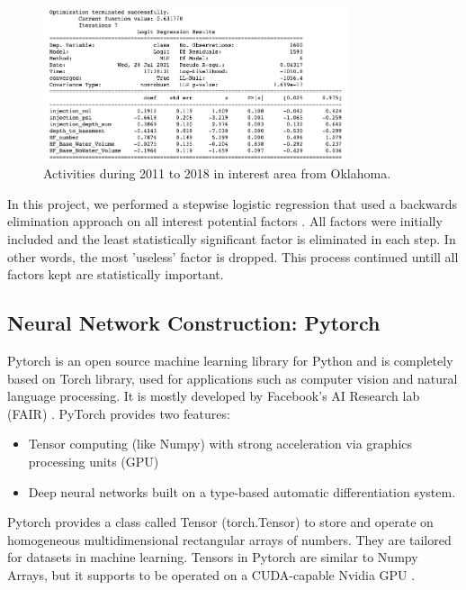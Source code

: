\documentclass[final-report]{report-template}
\begin{document}
\begin{figure}
    \begin{center}
        \includegraphics[width=0.8\textwidth]{p-value.png}
    \end{center}
    \caption{\label{fig:p-value} Activities during 2011 to 2018 in interest area from Oklahoma.}
\end{figure}

In this project, we performed a stepwise logistic regression that used a backwards elimination approach on all interest potential factors \citep{Ryan}.
All factors were initially included and the least statistically significant factor is eliminated in each step. In other words, the most 'useless' factor is dropped. This process continued untill all factors kept are statistically important.

\subsection{Neural Network Construction: Pytorch}
Pytorch is an open source machine learning library for Python and is completely based on Torch library,
used for applications such as computer vision and natural language processing. It is mostly developed by Facebook's AI Research lab (FAIR) \citep{patel2018two}. 
PyTorch provides two features:
\begin{itemize}
    \item Tensor computing (like Numpy) with strong acceleration via graphics processing units (GPU)
    \item Deep neural networks built on a type-based automatic differentiation system.
  \end{itemize}
Pytorch provides a class called Tensor (torch.Tensor) to store and operate on homogeneous multidimensional rectangular arrays of numbers. 
They are tailored for datasets in machine learning. Tensors in Pytorch are similar to Numpy Arrays, but it supports to be operated on a CUDA-capable Nvidia GPU \citep{paszke2019pytorch}.
\end{document}
